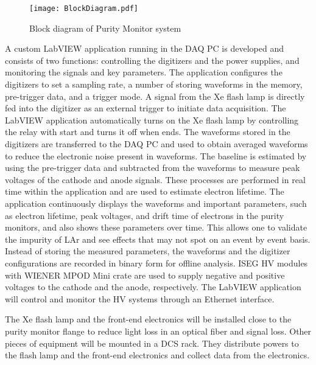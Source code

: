 \begin{figure}[h]
	\centering
	\texttt{[image: BlockDiagram.pdf]}
	\caption{Block diagram of Purity Monitor system}
	\label{fig:diagram}
\end{figure}

A custom LabVIEW application running in the DAQ PC is developed and consists of two functions: controlling the digitizers and the power supplies, and monitoring the signals and key parameters. The application configures the digitizers to set a sampling rate, a number of storing waveforms in the memory, pre-trigger data, and a trigger mode. A signal from the Xe flash lamp is directly fed into the digitizer as an external trigger to initiate data acquisition. The LabVIEW application automatically turns on the Xe flash lamp by controlling the relay with start and turns it off when ends. The waveforms stored in the digitizers are transferred to the DAQ PC and used to obtain averaged waveforms to reduce the electronic noise present in waveforms. The baseline is estimated by using the pre-trigger data and subtracted from the waveforms to measure peak voltages of the cathode and anode signals. These processes are performed in real time within the application and are used to estimate electron lifetime. The application continuously displays the waveforms and important parameters, such as electron lifetime, peak voltages, and drift time of electrons in the purity monitors, and also shows these parameters over time. This allows one to validate the impurity of LAr and see effects that may not spot on an event by event basis. Instead of storing the measured parameters, the waveforms and the digitizer configurations are recorded in binary form for offline analysis. ISEG HV modules with WIENER MPOD Mini crate are used to supply negative and positive voltages to the cathode and the anode, respectively. The LabVIEW application will control and monitor the HV systems through an Ethernet interface.  

The Xe flash lamp and the front-end electronics will be installed close to the purity monitor flange to reduce light loss in an optical fiber and signal loss. Other pieces of equipment will be mounted in a DCS rack. They distribute powers to the flash lamp and the front-end electronics and collect data from the electronics.




